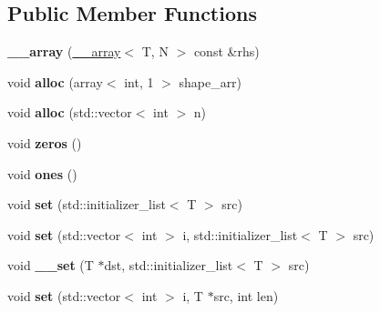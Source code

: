 \subsection*{Public Member Functions}
\begin{DoxyCompactItemize}
\item 
\hypertarget{class____array_ac3443fee161fd3f8ccb1290980a4190d}{{\bfseries \-\_\-\-\_\-array} (\hyperlink{class____array}{\-\_\-\-\_\-array}$<$ T, N $>$ const \&rhs)}\label{class____array_ac3443fee161fd3f8ccb1290980a4190d}

\item 
\hypertarget{class____array_a8a0f0e9f3af8384c29ddd21d3451b65e}{void {\bfseries alloc} (array$<$ int, 1 $>$ shape\-\_\-arr)}\label{class____array_a8a0f0e9f3af8384c29ddd21d3451b65e}

\item 
\hypertarget{class____array_a0ffa8a127e271c2ae60c705e5baaf6d1}{void {\bfseries alloc} (std\-::vector$<$ int $>$ n)}\label{class____array_a0ffa8a127e271c2ae60c705e5baaf6d1}

\item 
\hypertarget{class____array_a1072f5c538102121515000a4ef521303}{void {\bfseries zeros} ()}\label{class____array_a1072f5c538102121515000a4ef521303}

\item 
\hypertarget{class____array_ad1fd7d5c46fb341f54cab916b78be561}{void {\bfseries ones} ()}\label{class____array_ad1fd7d5c46fb341f54cab916b78be561}

\item 
\hypertarget{class____array_ae6a7f942aeb5857504e9db83f7cfac57}{void {\bfseries set} (std\-::initializer\-\_\-list$<$ T $>$ src)}\label{class____array_ae6a7f942aeb5857504e9db83f7cfac57}

\item 
\hypertarget{class____array_a483485b393733908c01c2cb2e74d08e0}{void {\bfseries set} (std\-::vector$<$ int $>$ i, std\-::initializer\-\_\-list$<$ T $>$ src)}\label{class____array_a483485b393733908c01c2cb2e74d08e0}

\item 
\hypertarget{class____array_af9523af4f7911a07f54d8fce750e3332}{void {\bfseries \-\_\-\-\_\-set} (T $\ast$dst, std\-::initializer\-\_\-list$<$ T $>$ src)}\label{class____array_af9523af4f7911a07f54d8fce750e3332}

\item 
\hypertarget{class____array_a272fe82c6f31832970e123ac4ca66b08}{void {\bfseries set} (std\-::vector$<$ int $>$ i, T $\ast$src, int len)}\label{class____array_a272fe82c6f31832970e123ac4ca66b08}


\end{DoxyCompactItemize}
